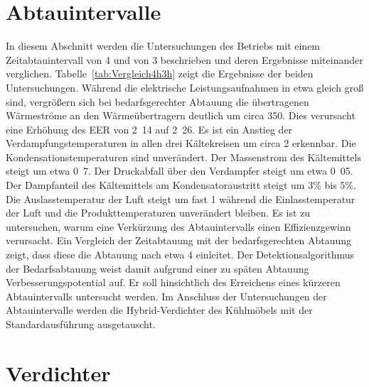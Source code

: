 \section{Abtauintervalle}
\label{sec:Abtauintervalle}

In diesem Abschnitt werden die Untersuchungen des Betriebs mit einem Zeitabtauintervall von \unit{4}{\hour} und von \unit{3}{\hour} beschrieben und deren Ergebnisse miteinander verglichen. 
Tabelle~\ref{tab:Vergleich4h3h} zeigt die Ergebnisse der beiden Untersuchungen.
Während die elektrische Leistungsaufnahmen in etwa gleich groß sind, vergrößern sich bei bedarfsgerechter Abtauung die übertragenen Wärmeströme an den Wärmeübertragern deutlich um circa \unit{350}{\watt}. Dies verursacht eine Erhöhung des EER von \unit{2.14}{} auf \unit{2.26}{}.
Es ist ein Anstieg der Verdampfungstemperaturen in allen drei Kältekreisen um circa \unit{2}{\kelvin} erkennbar. Die Kondensationstemperaturen sind unverändert. Der Massenstrom des Kältemittels steigt um etwa \unit{0.7}{\gram\per\second}. Der Druckabfall über den Verdampfer steigt um etwa \unit{0.05}{\bbar}. Der Dampfanteil des Kältemittels am Kondensatoraustritt steigt um \unit{3}{\%} bis \unit{5}{\%}. Die Auslasstemperatur der Luft steigt um fast \unit{1}{\kelvin} während die Einlasstemperatur der Luft und die Produkttemperaturen unverändert bleiben. \newline
Es ist zu untersuchen, warum eine Verkürzung des Abtauintervalls einen Effizienzgewinn verursacht. \newline
Ein Vergleich der Zeitabtauung mit der bedarfsgerechten Abtauung zeigt, dass diese die Abtauung nach etwa \unit{4}{\hour} einleitet. Der Detektionsalgorithmus der Bedarfsabtauung weist damit aufgrund einer zu späten Abtauung Verbesserungspotential auf. Er soll hinsichtlich des Erreichens eines kürzeren Abtauintervalls untersucht werden. \newline
Im Anschluss der Untersuchungen der Abtauintervalle werden die Hybrid-Verdichter des Kühlmöbels mit der Standardausführung ausgetauscht.

 




\clearpage



\section{Verdichter}
\label{sec:Verdichter}


